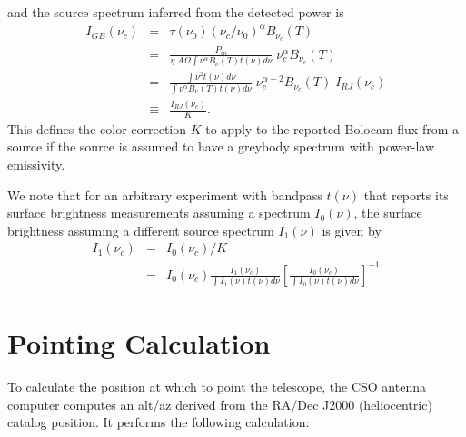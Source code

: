 \documentclass[12pt,preprint]{aastex}
\begin{document}
and the source spectrum inferred from the detected power is
\begin{eqnarray}
I_{GB}(\nu_c) & = & \tau(\nu_0) (\nu_c / \nu_0)^\alpha B_{\nu_c}(T) \\
\nonumber & = & \frac{P_{in}}{\eta \; A \Omega \int \nu^\alpha B_\nu(T) t(\nu) d \nu} \; \nu_c^\alpha B_{\nu_c}(T) \\
\nonumber & = & \frac{\int \nu^2 t(\nu) d \nu}{\int \nu^\alpha B_\nu(T) t(\nu) d \nu} \; \nu_c^{\alpha-2} B_{\nu_c}(T) \; I_{RJ}(\nu_c) \\
\nonumber & \equiv & \frac{I_{RJ}(\nu_c)}{K}.
\end{eqnarray}
This defines the color correction $K$ to apply to the reported Bolocam
flux from a source if the source is assumed to have a greybody
spectrum with power-law emissivity.

%
We note that for an arbitrary experiment with bandpass $t(\nu)$ that
reports its surface brightness measurements assuming a spectrum
$I_0(\nu)$, the surface brightness assuming a different source
spectrum $I_1(\nu)$ is given by
\begin{eqnarray}
I_1(\nu_c) &=& I_0(\nu_c) / K \\
\nonumber &=& I_0(\nu_c) \frac{I_1(\nu_c)}{\int I_1(\nu) t(\nu) d \nu} \left[\frac{I_0(\nu_c)}{\int I_0(\nu) t(\nu) d \nu} \right]^{-1}
\end{eqnarray}

\section{Pointing Calculation}
\label{sec:PointingCalculation}

To calculate the position at which to point the telescope, the CSO
antenna computer computes an alt/az derived from the RA/Dec J2000
(heliocentric) catalog position.  It performs the following
calculation:
\end{document}

